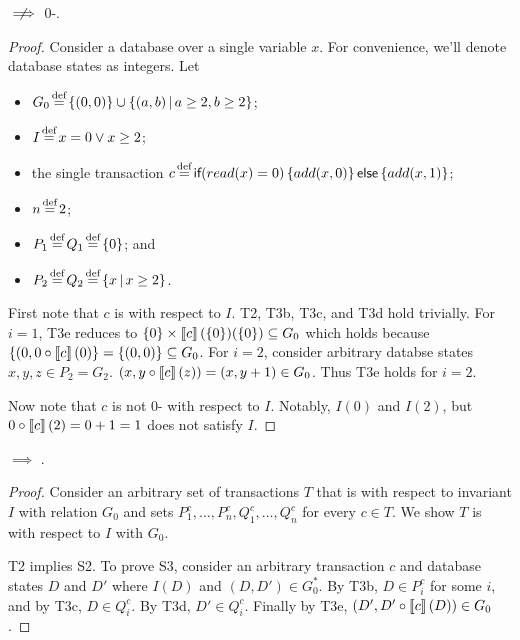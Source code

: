 \begin{claim}\label{clm:0-istrength-not-implies-0-isafety}
  \istrength{} $\centernot\implies$ 0-\isafety.
\end{claim}
\begin{proof}
  Consider a database over a single variable $x$. For convenience, we'll denote
  database states as integers. Let
  \begin{itemize}
    \item
      $G_0 \defeq \set{(0, 0)} \cup \setst{(a, b)}{a \geq 2, b \geq 2}$;
    \item
      $I \defeq x = 0 \lor x \geq 2$;
    \item
      the single \imp{} transaction $c \defeq
      \impif{read(x)=0}{add(x, 0)}{add(x, 1)}$;
    \item
      $n \defeq 2$;
    \item
      $P_1 \defeq Q_1 \defeq \set{0}$; and
    \item
      $P_2 \defeq Q_2 \defeq \setst{x}{x \geq 2}$.
  \end{itemize}

 First note that $c$ is \istrong{} with respect to $I$.  T2, T3b, T3c, and T3d
 hold trivially. For $i = 1$, T3e reduces to $\left\{0\right\} \times
 \left\llbracket c\right\rrbracket(\left\{0\right\})(\left\{0\right\}) \subseteq G_0$ which holds because $\left\{(0, 0
 \circ \left\llbracket c\right\rrbracket(0)\right\} = \left\{(0, 0)\right\} \subseteq G_0$. For $i = 2$, consider
 arbitrary databse states $x,y,z \in P_2 = G_2$. $(x, y \circ \left\llbracket c\right\rrbracket(z)) =
 (x, y + 1) \in G_0$. Thus T3e holds for $i = 2$.

  Now note that $c$ is not 0-\isafe{} with respect to $I$. Notably, $I(0)$ and
  $I(2)$, but $0 \circ \left\llbracket c\right\rrbracket(2) = 0 + 1 = 1$ does not satisfy $I$.
\end{proof}

\begin{claim}\label{clm:istrength-implies-istrengthstar}
  \istrength{} $\implies$ \istrengthstar{}.
\end{claim}
\begin{proof}
  Consider an arbitrary set of \imp{} transactions $T$ that is \istrong{} with
  respect to invariant $I$ with relation $G_0$ and sets $P_1^c, \ldots, P_n^c,
  Q_1^c, \ldots, Q_n^c$ for every $c \in T$. We show $T$ is \istrongstar{} with
  respect to $I$ with $G_0$.

  T2 implies S2. To prove S3, consider an arbitrary transaction $c$ and
  database states $D$ and $D'$ where $I(D)$ and $(D, D') \in G_0^*$. By T3b, $D
  \in P_i^c$ for some $i$, and by T3c, $D \in Q_i^c$. By T3d, $D' \in Q_i^c$.
  Finally by T3e, $(D', D' \circ \left\llbracket c\right\rrbracket(D)) \in G_0$.
\end{proof}

